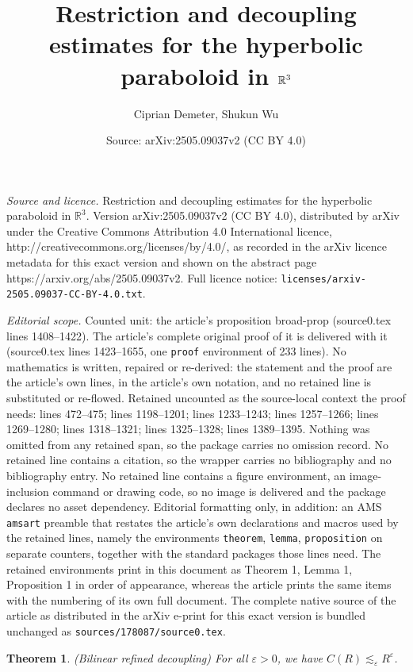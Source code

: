 \documentclass[10pt,a4paper]{amsart}
\title{Restriction and decoupling estimates for the hyperbolic paraboloid in $\R^3$}
\author{Ciprian Demeter, Shukun Wu}
\date{Source: arXiv:2505.09037v2 (CC BY 4.0)}
\newcommand{\R}{\mathbb{R}}
\newtheorem{theorem}{Theorem}
\newcommand{\e}{\varepsilon}
\begin{document}
\maketitle

\noindent\emph{Source and licence.} Restriction and decoupling estimates for the hyperbolic paraboloid in $\R^3$. Version arXiv:2505.09037v2 (CC BY 4.0), distributed by arXiv under the Creative Commons Attribution 4.0 International licence, http://creativecommons.org/licenses/by/4.0/, as recorded in the arXiv licence metadata for this exact version and shown on the abstract page https://arxiv.org/abs/2505.09037v2. Full licence notice: \texttt{licenses/arxiv-2505.09037-CC-BY-4.0.txt}.\par\smallskip

\noindent\textit{Editorial scope.} Counted unit: the article's proposition broad-prop (source0.tex lines 1408--1422). The article's complete original proof of it is delivered with it (source0.tex lines 1423--1655, one \texttt{proof} environment of 233 lines). No mathematics is written, repaired or re-derived: the statement and the proof are the article's own lines, in the article's own notation, and no retained line is substituted or re-flowed.  Retained uncounted as the source-local context the proof needs: lines 472--475; lines 1198--1201; lines 1233--1243; lines 1257--1266; lines 1269--1280; lines 1318--1321; lines 1325--1328; lines 1389--1395.  Nothing was omitted from any retained span, so the package carries no omission record.  No retained line contains a citation, so the wrapper carries no bibliography and no bibliography entry.  No retained line contains a figure environment, an image-inclusion command or drawing code, so no image is delivered and the package declares no asset dependency.  Editorial formatting only, in addition: an AMS \texttt{amsart} preamble that restates the article's own declarations and macros used by the retained lines, namely the environments \texttt{theorem}, \texttt{lemma}, \texttt{proposition} on separate counters, together with the standard packages those lines need.  The retained environments print in this document as Theorem 1, Lemma 1, Proposition 1 in order of appearance, whereas the article prints the same items with the numbering of its own full document.  The complete native source of the article as distributed in the arXiv e-print for this exact version is bundled unchanged as \texttt{sources/178087/source0.tex}.
\begin{theorem}(Bilinear refined decoupling)
\label{refined-dec-thm}
For all $\e>0$, we have	$C(R)\lesssim_\e R^\e$.
\end{theorem}
\end{document}
